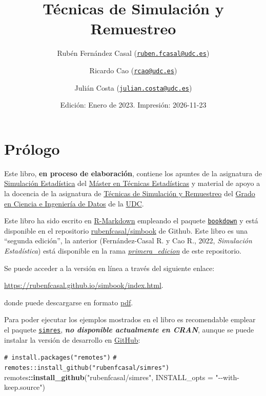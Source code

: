\documentclass[
  spanish,
  10pt,
]{book}
\title{Técnicas de Simulación y Remuestreo}
\author{Rubén Fernández Casal (\href{mailto:ruben.fcasal@udc.es}{\nolinkurl{ruben.fcasal@udc.es}}) \and Ricardo Cao (\href{mailto:rcao@udc.es}{\nolinkurl{rcao@udc.es}}) \and Julián Costa (\href{mailto:julian.costa@udc.es}{\nolinkurl{julian.costa@udc.es}})}
\date{Edición: Enero de 2023. Impresión: 2026-11-23}
\newenvironment{Shaded}{\begin{snugshade}}{\end{snugshade}}
\newcommand{\AttributeTok}[1]{\textcolor[rgb]{0.13,0.29,0.53}{#1}}
\newcommand{\CommentTok}[1]{\textcolor[rgb]{0.56,0.35,0.01}{\textit{#1}}}
\newcommand{\FunctionTok}[1]{\textcolor[rgb]{0.13,0.29,0.53}{\textbf{#1}}}
\newcommand{\NormalTok}[1]{#1}
\newcommand{\SpecialCharTok}[1]{\textcolor[rgb]{0.81,0.36,0.00}{\textbf{#1}}}
\newcommand{\StringTok}[1]{\textcolor[rgb]{0.31,0.60,0.02}{#1}}
\theoremstyle{break}
\theoremstyle{nonumberplain}
\renewcommand{\CommentTok}[1]{\textcolor[rgb]{0.41,0.41,0.41}{\texttt{#1}}}
\begin{document}
\maketitle

{
\setcounter{tocdepth}{1}
\tableofcontents
}
\chapter*{Prólogo}\label{pruxf3logo}

Este libro, \textbf{en proceso de elaboración}, contiene los apuntes de la asignatura de \href{http://eamo.usc.es/pub/mte/index.php/es/?option=com_content&view=article&id=2201&idm=13&a\%C3\%B1o=2019}{Simulación Estadística} del \href{http://eio.usc.es/pub/mte}{Máster en Técnicas Estadísticas} y material de apoyo a la docencia de la asignatura de \href{https://guiadocente.udc.es/guia_docent/index.php?centre=614&ensenyament=614G02&assignatura=614G02036&idioma=cast}{Técnicas de Simulación y Remuestreo} del \href{https://estudos.udc.es/es/study/start/614G02V01}{Grado en Ciencia e Ingeniería de Datos} de la \href{https://www.udc.es}{UDC}.

Este libro ha sido escrito en \href{http://rmarkdown.rstudio.com}{R-Markdown} empleando el paquete \href{https://bookdown.org/yihui/bookdown/}{\texttt{bookdown}} y está disponible en el repositorio \href{https://github.com/rubenfcasal/simbook}{rubenfcasal/simbook} de Github.
Este libro es una ``segunda edición'', la anterior (Fernández-Casal R. y Cao R., 2022, \emph{Simulación Estadística}) está disponible en la rama \emph{\href{https://github.com/rubenfcasal/simbook/tree/primera_edicion}{primera\_edicion}} de este repositorio.

Se puede acceder a la versión en línea a través del siguiente enlace:

\url{https://rubenfcasal.github.io/simbook/index.html}.

donde puede descargarse en formato \href{https://rubenfcasal.github.io/simbook/Simulacion.pdf}{pdf}.

Para poder ejecutar los ejemplos mostrados en el libro es recomendable emplear el paquete \href{https://rubenfcasal.github.io/simres}{\texttt{simres}}, \textbf{\emph{no disponible actualmente en CRAN}}, aunque se puede instalar la versión de desarrollo en \href{https://github.com/rubenfcasal/simres}{GitHub}:

\begin{Shaded}
\begin{Highlighting}[]
\CommentTok{\# install.packages("remotes")}
\CommentTok{\# remotes::install\_github("rubenfcasal/simres")}
\NormalTok{remotes}\SpecialCharTok{::}\FunctionTok{install\_github}\NormalTok{(}\StringTok{"rubenfcasal/simres"}\NormalTok{, }\AttributeTok{INSTALL\_opts =} \StringTok{"{-}{-}with{-}keep.source"}\NormalTok{)}
\end{Highlighting}
\end{Shaded}
\end{document}
